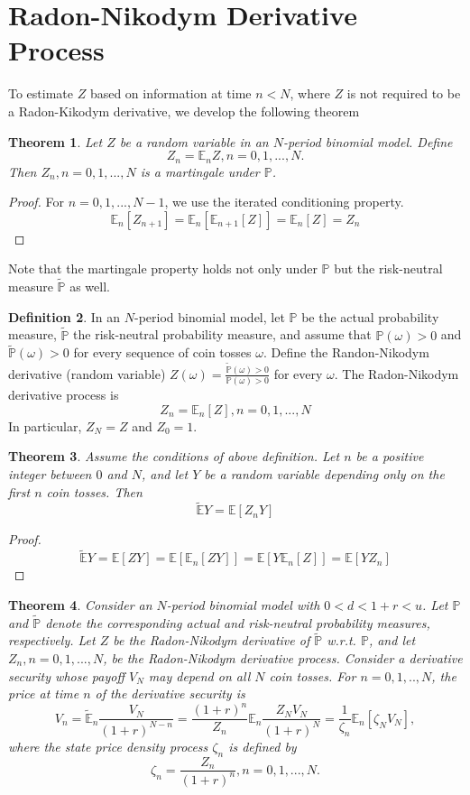 \documentclass[a4paper]{article}
\newtheorem{thm}{Theorem}
\theoremstyle{definition}
\newtheorem{defn}[thm]{Definition}
\begin{document}
\section{Radon-Nikodym Derivative Process}
To estimate $Z$ based on information at time $n<N$, where $Z$ is not required to be a Radon-Kikodym derivative, we develop the following theorem
\begin{thm}
	Let $Z$ be a random variable in an $N$-period binomial model. Define
	$$Z_n = \mathbb{E}_n Z, n=0,1,...,N.$$
	Then $Z_n, n=0,1,...,N$ is a martingale under $\mathbb{P}$.
\end{thm}
\begin{proof}
	For $n=0,1,...,N-1$, we use the iterated conditioning property. 
	$$\mathbb{E}_n[Z_{n+1}]=\mathbb{E}_n[\mathbb{E}_{n+1}[Z]]=\mathbb{E}_n[Z]=Z_n$$
\end{proof}
Note that the martingale property holds not only under $\mathbb{P}$ but the risk-neutral measure $\tilde{\mathbb{P}}$ as well.
\begin{defn}
	In an $N$-period binomial model, let $\mathbb{P}$ be the actual probability measure, $\tilde{\mathbb{P}}$ the risk-neutral probability measure, and assume that $\mathbb{P}(\omega)>0$ and $\tilde{\mathbb{P}}(\omega)>0$ for every sequence of coin tosses $\omega$. Define the Randon-Nikodym derivative (random variable) $Z(\omega) = \frac{\tilde{\mathbb{P}}(\omega)>0}{\mathbb{P}(\omega)>0}$ for every $\omega$. The Radon-Nikodym derivative process is 
	$$Z_n = \mathbb{E}_n[Z], n=0,1,...,N$$
	In particular, $Z_N=Z$ and $Z_0=1$. 
\end{defn}
\begin{thm}
	Assume the conditions of above definition. Let $n$ be a positive integer between $0$ and $N$, and let $Y$ be a random variable depending only on the first $n$ coin tosses. Then 
	$$\tilde{\mathbb{E}}Y = \mathbb{E}[Z_n Y]$$
\end{thm}
\begin{proof}
	$$\tilde{\mathbb{E}}Y = \mathbb{E}[ZY]=\mathbb{E}[\mathbb{E}_n[ZY]]=\mathbb{E}[Y\mathbb{E}_n[Z]]=\mathbb{E}[YZ_n]$$
\end{proof}
\begin{thm}
	Consider an $N$-period binomial model with $0<d<1+r<u$. Let $\mathbb{P}$ and $\tilde{\mathbb{P}}$ denote the corresponding actual and risk-neutral probability measures, respectively. Let $Z$ be the Radon-Nikodym derivative of $\tilde{\mathbb{P}}$ w.r.t. $\mathbb{P}$, and let $Z_n,n=0,1,...,N$, be the Radon-Nikodym derivative process. 
	Consider a derivative security whose payoff $V_N$ may depend on all $N$ coin tosses. For $n=0,1,..,N$, the price at time $n$ of the derivative security is 
	$$V_n = \tilde{\mathbb{E}}_n\frac{V_N}{(1+r)^{N-n}}=\frac{(1+r)^n}{Z_n}\mathbb{E}_n\frac{Z_NV_N}{(1+r)^N}=\frac{1}{\zeta_n}\mathbb{E}_n[\zeta_NV_N],$$
	where the state price density process $\zeta_n$ is defined by 
	$$\zeta_n=\frac{Z_n}{(1+r)^n}, n=0,1,...,N.$$
\end{thm}
\end{document}
